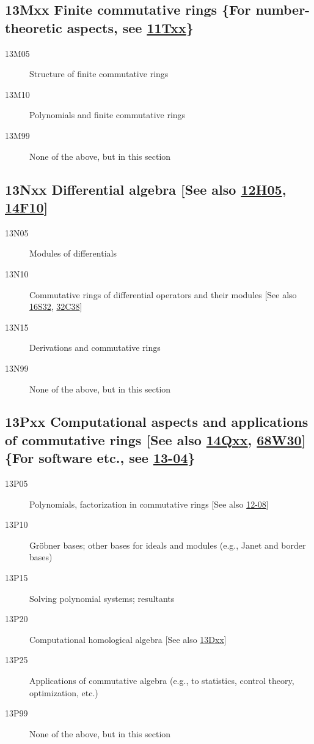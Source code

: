 \subsection*{13Mxx Finite commutative rings \{For number-theoretic aspects, see \hyperref[11Txx]{11Txx}\} }\label{13Mxx}
\begin{description}               
\item [13M05]\label{13M05} Structure of finite commutative rings
\item [13M10]\label{13M10} Polynomials and finite commutative rings
\item [13M99]\label{13M99} None of the above, but in this section
\end{description}          
\subsection*{13Nxx Differential algebra [See also \hyperref[12H05]{12H05}, \hyperref[14F10]{14F10}] }\label{13Nxx}
\begin{description}               
\item [13N05]\label{13N05} Modules of differentials
\item [13N10]\label{13N10} Commutative rings of differential operators and their modules [See also \hyperref[16S32]{16S32}, \hyperref[32C38]{32C38}]
\item [13N15]\label{13N15} Derivations and commutative rings
\item [13N99]\label{13N99} None of the above, but in this section
\end{description}          
\subsection*{13Pxx Computational aspects and applications of commutative rings [See also \hyperref[14Qxx]{14Qxx}, \hyperref[68W30]{68W30}] \{For software etc., see \hyperref[13-04]{13-04}\}}\label{13Pxx}
\begin{description}               
\item [13P05]\label{13P05} Polynomials, factorization in commutative rings [See also \hyperref[12-08]{12-08}]
\item [13P10]\label{13P10} Gr\"{o}bner bases; other bases for ideals and modules (e.g., Janet and border bases)
\item [13P15]\label{13P15} Solving polynomial systems; resultants
\item [13P20]\label{13P20} Computational homological algebra [See also \hyperref[13Dxx]{13Dxx}]
\item [13P25]\label{13P25} Applications of commutative algebra (e.g., to statistics, control theory, optimization, etc.)
\item [13P99]\label{13P99} None of the above, but in this section
\end{description}               
